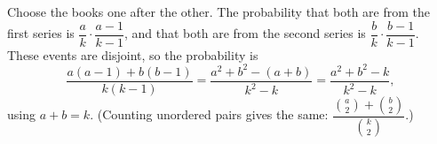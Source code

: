 Choose the books one after the other. The probability that both are from the first series is $\dfrac{a}{k}\cdot\dfrac{a-1}{k-1}$, and that both are from the second series is $\dfrac{b}{k}\cdot\dfrac{b-1}{k-1}$. These events are disjoint, so the probability is
\[
\dfrac{a(a-1)+b(b-1)}{k(k-1)}=\dfrac{a^2+b^2-(a+b)}{k^2-k}=\dfrac{a^2+b^2-k}{k^2-k},
\]
using $a+b=k$. (Counting unordered pairs gives the same: $\dfrac{\binom a2+\binom b2}{\binom k2}$.)
